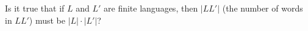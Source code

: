   Is it true that if $L$ and $L'$ are finite languages,
  then $|LL'|$ (the number of words in $LL'$)
  must be $|L| \cdot |L'|$?

